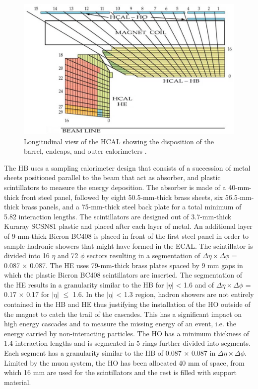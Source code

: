     \begin{figure}[h!]
      \centering
      \includegraphics[width=\textwidth]{img/I-3-cms/hcal.png}
      \caption{Longitudinal view of the HCAL showing the disposition of the barrel, endcaps, and outer calorimeters \cite{1748-0221-3-08-S08004}.}
      \label{fig:I-3-hcal}
    \end{figure}

    The HB uses a sampling calorimeter design that consists of a succession of metal sheets positioned parallel to the beam that act as absorber, and plastic scintillators to measure the energy deposition. The absorber is made of a 40-mm-thick front steel panel, followed by eight 50.5-mm-thick brass sheets, six 56.5-mm-thick brass panels, and a 75-mm-thick steel back plate for a total minimum of 5.82 interaction lengths. The scintillators are designed out of 3.7-mm-thick Kuraray SCSN81 plastic and placed after each layer of metal. An additional layer of 9-mm-thick Bicron BC408 is placed in front of the first steel panel in order to sample hadronic showers that might have formed in the ECAL. The scintillator is divided into 16 $ \eta $ and 72 $ \phi $ sectors resulting in a segmentation of $ \Delta \eta \times \Delta \phi $ = 0.087 $ \times $ 0.087. The HE uses 79-mm-thick brass plates spaced by 9 mm gaps in which the plastic Bicron BC408 scintillators are inserted. The segmentation of the HE results in a granularity similar to the HB for $ | \eta | $ < 1.6 and of $ \Delta \eta \times \Delta \phi $ = 0.17 $ \times $ 0.17 for $ | \eta | $ $ \le $ 1.6. In the $ | \eta | $ < 1.3 region, hadron showers are not entirely contained in the HB and HE thus justifying the installation of the HO outside of the magnet to catch the trail of the cascades. This has a significant impact on high energy cascades and to measure the missing energy of an event, i.e. the energy carried by non-interacting particles. The HO has a minimum thickness of 1.4 interaction lengths and is segmented in 5 rings further divided into segments. Each segment has a granularity similar to the HB of 0.087 $ \times $ 0.087 in $ \Delta \eta \times \Delta \phi $. Limited by the muon system, the HO has been allocated 40 mm of space, from which 16 mm are used for the scintillators and the rest is filled with support material. \\

